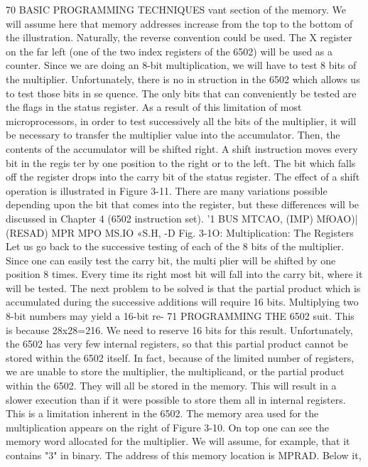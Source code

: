 70
BASIC PROGRAMMING TECHNIQUES
vant section of the memory. We will assume here that memory
addresses increase from the top to the bottom of the illustration.
Naturally, the reverse convention could be used. The X register on
the far left (one of the two index registers of the 6502) will be used
as a counter. Since we are doing an 8-bit multiplication, we will
have to test 8 bits of the multiplier. Unfortunately, there is no in
struction in the 6502 which allows us to test those bits in se
quence. The only bits that can conveniently be tested are the
flags in the status register. As a result of this limitation of most
microprocessors, in order to test successively all the bits of the
multiplier, it will be necessary to transfer the multiplier value
into the accumulator. Then, the contents of the accumulator will
be shifted right. A shift instruction moves every bit in the regis
ter by one position to the right or to the left. The bit which falls
off the register drops into the carry bit of the status register. The
effect of a shift operation is illustrated in Figure 3-11. There are
many variations possible depending upon the bit that comes into
the register, but these differences will be discussed in Chapter 4
(6502 instruction set).
'1
BUS
MTCAO,
(IMP)
MfOAO)|
(RESAD)
MPR
MPO
MS.IO
«S.H,
-D
Fig. 3-1O: Multiplication: The Registers
Let us go back to the successive testing of each of the 8 bits of
the multiplier. Since one can easily test the carry bit, the multi
plier will be shifted by one position 8 times. Every time its right
most bit will fall into the carry bit, where it will be tested.
The next problem to be solved is that the partial product which
is accumulated during the successive additions will require
16 bits. Multiplying two 8-bit numbers may yield a 16-bit re-
71
PROGRAMMING THE 6502
suit. This is because 28x28=216. We need to reserve 16 bits for this
result. Unfortunately, the 6502 has very few internal registers, so
that this partial product cannot be stored within the 6502 itself.
In fact, because of the limited number of registers, we are unable
to store the multiplier, the multiplicand, or the partial product
within the 6502. They will all be stored in the memory. This will
result in a slower execution than if it were possible to store them
all in internal registers. This is a limitation inherent in the 6502.
The memory area used for the multiplication appears on the right
of Figure 3-10. On top one can see the memory word allocated for
the multiplier. We will assume, for example, that it contains "3" in
binary. The address of this memory location is MPRAD. Below it,
